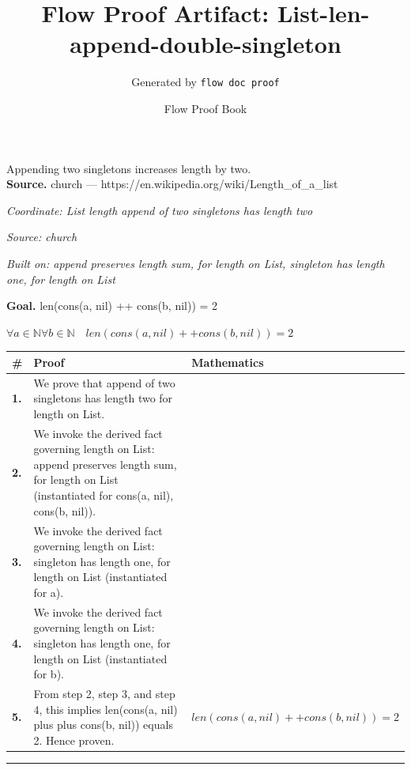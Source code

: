 \documentclass[11pt]{article}
\title{Flow Proof Artifact: List-len-append-double-singleton}
\author{Generated by \texttt{flow doc proof}}
\date{Flow Proof Book}
\theoremstyle{definition}
\begin{document}
\maketitle
Appending two singletons increases length by two.\\[0.5em]
\textbf{Source.} church — https://en.wikipedia.org/wiki/Length\_of\_a\_list\\[0.5em]
\bigskip
{}\par
\smallskip\noindent\textit{Coordinate: List \cdot length \cdot append of two singletons has length two}\par
\smallskip\noindent\textit{Source: church}\par
\smallskip\noindent\textit{Built on: append preserves length sum, for length on List, singleton has length one, for length on List}\par
\medskip
\noindent\textbf{Goal.} len(cons(a, nil) ++ cons(b, nil)) = 2\par
\noindent$\displaystyle \forall a \in \mathbb{N} \forall b \in \mathbb{N}\quad len(cons(a, nil) ++ cons(b, nil)) = 2$\par
\medskip
\noindent
\begin{tabular}{@{} >{\raggedright\arraybackslash}p{} >{\raggedright\arraybackslash}p{} >{\raggedleft\arraybackslash}p{} @{}}
\textbf{\#} & \textbf{Proof} & \textbf{Mathematics} \\
\midrule
\textbf{1.} & We prove that append of two singletons has length two for length on List. & \\[0.45em]
\textbf{2.} & We invoke the derived fact governing length on List: append preserves length sum, for length on List (instantiated for cons(a, nil), cons(b, nil)). & \\[0.45em]
\textbf{3.} & We invoke the derived fact governing length on List: singleton has length one, for length on List (instantiated for a). & \\[0.45em]
\textbf{4.} & We invoke the derived fact governing length on List: singleton has length one, for length on List (instantiated for b). & \\[0.45em]
\textbf{5.} & From step 2, step 3, and step 4, this implies len(cons(a, nil) plus plus cons(b, nil)) equals 2. Hence proven. & $\displaystyle len(cons(a, nil) ++ cons(b, nil)) = 2$ \\[0.45em]
\bottomrule
\end{tabular}
\label{thm:List-length-append_of_two_singletons_has_length_two}
\par\medskip\hrule
\end{document}
